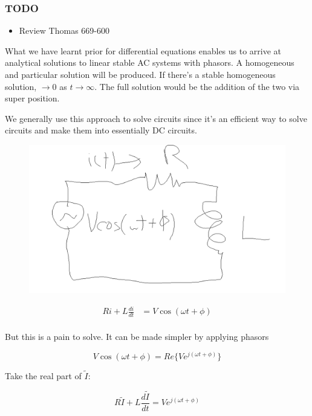 \documentclass[10pt]{article}
\begin{document}
\subsubsection{TODO}
\begin{itemize}
	\item Review Thomas 669-600
\end{itemize}

What we have learnt prior for differential equations enables us to arrive at analytical solutions to linear stable AC systems with phasors.
A homogeneous and particular solution will be produced.
If there's a stable homogeneous solution, $ \to 0 $ as $ t \to \infty $. The full solution would be the addition of the two via super position.

We generally use this approach to solve circuits since it's an efficient way to solve circuits and make them into essentially DC circuits.

\begin{figure}[H]
	\centering
	\includegraphics[width=0.8\linewidth]{img/image_2022-09-09-15-23-06.png}
\end{figure}

\begin{equation}
	\begin{split}
		Ri + L \frac{di}{dt} &= V \cos{(\omega t + \phi)}  \\
	\end{split}
\end{equation}


But this is a pain to solve. It can be made simpler by applying phasors

\begin{equation}
	V \cos{(\omega t + \phi)}  = Re\{ Ve^{j(\omega t + \phi)} \}
\end{equation}

Take the real part of $ \tilde{I} $:

\begin{equation}
	R \tilde{I} + L \frac{d\tilde{I}}{dt} = Ve^{j(\omega t + \phi)}
\end{equation}
\end{document}
